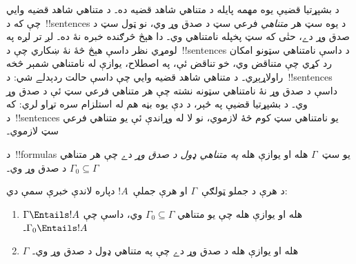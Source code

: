 \documentclass[../../../include/open-logic-section]{subfiles}
\begin{document}
      {}
      {}


د بشپړتيا قضيې يوه مهمه پايله د متناهي شاهد قضيه ده۔ د متناهي
شاهد قضيه وايي چې که د~!!{sentence}s د يوه سټ هر
\emph{متناهي} فرعي سټ د صدق وړ وي، نو ټول سټ د صدق وړ دے، حتٰی
که سټ پخپله نامتناهي وي۔ دا هېڅ څرګنده خبره نۀ ده۔ لږ تر لږه په
لومړي نظر داسې هېڅ څۀ نۀ ښکاري چې د~!!{sentence}s د داسې نامتناهي
سټونو امکان رد کړي چې متناقض وي، خو تناقض ئې، په اصطلاح، يوازې له
نامتناهي شمېر څخه راولاړېږي۔ د متناهي شاهد قضيه وايي چې داسې حالت
ردېدلے شي: د~!!{sentence}s داسې د صدق وړ نۀ نامتناهي سټونه نشته
چې هر متناهي فرعي سټ ئې د صدق وړ وي۔ د بشپړتيا قضيې په څېر، د دې
يوه بڼه هم له استلزام سره تړاو لري: که د~!!{sentence}s يو نامتناهي
سټ کوم څۀ لازموي، نو لا له وړاندې ئې يو متناهي فرعي سټ لازموي۔

\begin{defn}
  د~!!{formula}s يو سټ~$\Gamma$ هله او يوازې هله
  \emph{په متناهي ډول د صدق وړ} دے چې هر متناهي
  $\Gamma_0 \subseteq \Gamma$ د صدق وړ وي۔
\end{defn}

\begin{thm}
د هرې د جملو ټولګې~$\Gamma$ او هرې جملې~$!A$ دپاره لاندې خبرې سمې دي:
\begin{enumerate}
  \item $\Gamma \Entails !A$ هله او يوازې هله چې يو متناهي
    $\Gamma_0 \subseteq \Gamma$ وي، داسې چې
    $\Gamma_0 \Entails !A$۔
  \item $\Gamma$ هله او يوازې هله د صدق وړ دے چې په متناهي ډول
    د صدق وړ وي۔
\end{enumerate}
\end{thm}
\end{document}
